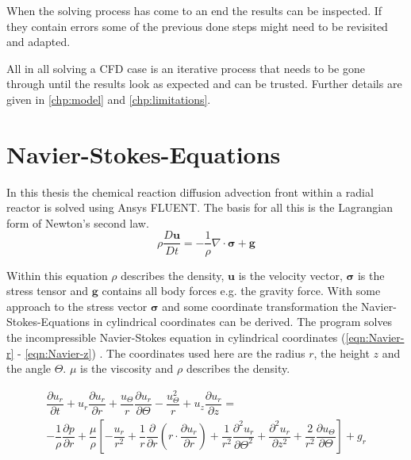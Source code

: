 \documentclass[../thesis.tex]{subfiles}
\begin{document}
When the solving process has come to an end the results can be inspected. If they contain errors some of the previous done steps might need to be revisited and adapted. 

All in all solving a CFD case is an iterative process that needs to be gone through until the results look as expected and can be trusted. Further details are given in \autoref{chp:model} and \autoref{chp:limitations}.

\section{Navier-Stokes-Equations}

In this thesis the chemical reaction diffusion advection front within a radial reactor is solved using Ansys FLUENT. The basis for all this is the Lagrangian form of Newton's second law. 
\begin{equation}
	\rho \dfrac{D \textbf{u}}{D t} = - \dfrac{1}{\rho} \nabla \cdot \boldsymbol{\sigma} + \textbf{g}
\end{equation}

Within this equation $\rho$ describes the density, $\textbf{u}$ is the velocity vector, $\boldsymbol{\sigma}$ is the stress tensor and $\textbf{g}$ contains all body forces e.g. the gravity force.
With some approach to the stress vector $\boldsymbol{\sigma}$ and some coordinate transformation the Navier-Stokes-Equations in cylindrical coordinates can be derived.
The program solves the incompressible Navier-Stokes equation in cylindrical coordinates (\autoref{eqn:Navier-r} - \autoref{eqn:Navier-z}) \cite{vitturi2016navier}. The coordinates used here are the radius $r$, the height $z$ and the angle $\Theta$. $\mu$ is the viscosity and $\rho$ describes the density.

\begin{gather}
	\label{eqn:Navier-r}
	 \dfrac{\partial u_r}{\partial t} + u_r \dfrac{\partial u_r}{\partial r} + \dfrac{u_\Theta}{ r} \dfrac{\partial u_r}{\partial \Theta} - \dfrac{u_\Theta^2}{r} + u_z \dfrac{\partial u_r}{\partial z} = \\ \nonumber
	-\dfrac{1}{\rho} \dfrac{\partial p}{\partial r} + \dfrac{\mu}{\rho} \left[
		- \dfrac{u_r}{r^2} + \dfrac{1}{r} \dfrac{\partial}{\partial r} \left( r \cdot \dfrac{\partial u_r}{\partial r} \right) +
		\dfrac{1}{r^2} \dfrac{\partial^2 u_r}{\partial \Theta^2} + \dfrac{\partial^2 u_r}{\partial z^2} + \dfrac{2}{r^2} \dfrac{\partial u_\Theta}{\partial \Theta}
	\right] + g_r
\end{gather}
\end{document}
